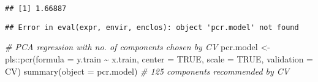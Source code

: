 \documentclass[
]{article}
\newenvironment{Shaded}{\begin{snugshade}}{\end{snugshade}}
\newcommand{\AttributeTok}[1]{\textcolor[rgb]{0.77,0.63,0.00}{#1}}
\newcommand{\CommentTok}[1]{\textcolor[rgb]{0.56,0.35,0.01}{\textit{#1}}}
\newcommand{\ConstantTok}[1]{\textcolor[rgb]{0.00,0.00,0.00}{#1}}
\newcommand{\FunctionTok}[1]{\textcolor[rgb]{0.00,0.00,0.00}{#1}}
\newcommand{\NormalTok}[1]{#1}
\newcommand{\OtherTok}[1]{\textcolor[rgb]{0.56,0.35,0.01}{#1}}
\newcommand{\SpecialCharTok}[1]{\textcolor[rgb]{0.00,0.00,0.00}{#1}}
\newcommand{\StringTok}[1]{\textcolor[rgb]{0.31,0.60,0.02}{#1}}
\begin{document}
\begin{verbatim}
## [1] 1.66887
\end{verbatim}

\begin{Shaded}
\end{Shaded}

\begin{verbatim}
## Error in eval(expr, envir, enclos): object 'pcr.model' not found
\end{verbatim}

\begin{Shaded}
\begin{Highlighting}[]
\CommentTok{\# PCA regression with no. of components chosen by CV}
\NormalTok{pcr.model }\OtherTok{\textless{}{-}}\NormalTok{ pls}\SpecialCharTok{::}\FunctionTok{pcr}\NormalTok{(}\AttributeTok{formula =}\NormalTok{ y.train }\SpecialCharTok{\textasciitilde{}}\NormalTok{ x.train, }\AttributeTok{center =} \ConstantTok{TRUE}\NormalTok{, }\AttributeTok{scale =} \ConstantTok{TRUE}\NormalTok{, }\AttributeTok{validation =} \StringTok{\textquotesingle{}CV\textquotesingle{}}\NormalTok{)}
\FunctionTok{summary}\NormalTok{(}\AttributeTok{object =}\NormalTok{ pcr.model) }\CommentTok{\# 125 components recommended by CV}
\end{Highlighting}
\end{Shaded}
\end{document}
